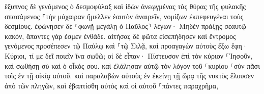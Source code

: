 \documentclass{openreader}
\begin{document}
ἔξυπνος δὲ γενόμενος ὁ δεσμοφύλαξ καὶ ἰδὼν ἀνεῳγμένας τὰς θύρας τῆς φυλακῆς σπασάμενος ⸀τὴν μάχαιραν ἤμελλεν ἑαυτὸν ἀναιρεῖν, νομίζων ἐκπεφευγέναι τοὺς δεσμίους. 
ἐφώνησεν δὲ ⸂φωνῇ μεγάλῃ ὁ Παῦλος⸃ λέγων· Μηδὲν πράξῃς σεαυτῷ κακόν, ἅπαντες γάρ ἐσμεν ἐνθάδε. 
αἰτήσας δὲ φῶτα εἰσεπήδησεν καὶ ἔντρομος γενόμενος προσέπεσεν τῷ Παύλῳ καὶ ⸀τῷ Σιλᾷ, 
καὶ προαγαγὼν αὐτοὺς ἔξω ἔφη· Κύριοι, τί με δεῖ ποιεῖν ἵνα σωθῶ; 
οἱ δὲ εἶπαν· Πίστευσον ἐπὶ τὸν κύριον ⸀Ἰησοῦν, καὶ σωθήσῃ σὺ καὶ ὁ οἶκός σου. 
καὶ ἐλάλησαν αὐτῷ τὸν λόγον τοῦ ⸀κυρίου ⸀σὺν πᾶσι τοῖς ἐν τῇ οἰκίᾳ αὐτοῦ. 
καὶ παραλαβὼν αὐτοὺς ἐν ἐκείνῃ τῇ ὥρᾳ τῆς νυκτὸς ἔλουσεν ἀπὸ τῶν πληγῶν, καὶ ἐβαπτίσθη αὐτὸς καὶ οἱ αὐτοῦ ⸀πάντες παραχρῆμα, 
\end{document}
